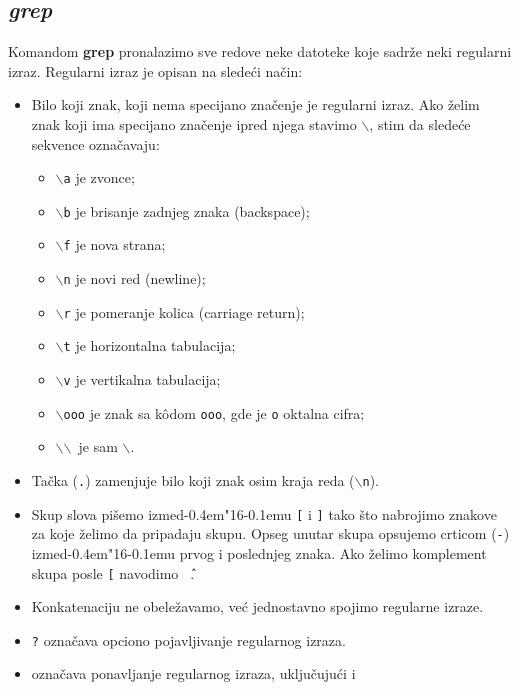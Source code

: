 \documentclass[12pt,a4paper,titlepage]{article}
\def\d{d\kern-0.4em\char"16\kern-0.1em}
\def\bs{$\backslash$}
\begin{document}
    \subsection{\em grep}
      \label{sub:grep}
      Komandom {\bf grep} pronalazimo sve redove neke datoteke koje sadr\v ze
      neki regularni izraz.
      Regularni izraz je opisan na slede\'ci na\v cin:
      \begin{itemize}
      \item
        Bilo koji znak, koji nema specijano zna\v cenje je regularni izraz.
        Ako \v zelim znak koji ima specijano zna\v cenje ipred njega stavimo
        {\tt\bs}, stim da slede\'ce sekvence ozna\v cavaju:
        \begin{itemize}
        \item
          {\tt\bs a} je zvonce;
        \item
          {\tt\bs b} je brisanje zadnjeg znaka (backspace);
        \item
          {\tt\bs f} je nova strana;
        \item
          {\tt\bs n} je novi red (newline);
        \item
          {\tt\bs r} je pomeranje kolica (carriage return);
        \item
          {\tt\bs t} je horizontalna tabulacija;
        \item
          {\tt\bs v} je vertikalna tabulacija;
        \item
          {\tt\bs ooo} je znak sa k\^odom {\tt ooo}, gde je {\tt o} oktalna
          cifra;
        \item
          \bs\bs\ je sam \bs.
        \end{itemize}
      \item
        Ta\v cka ({\tt.}) zamenjuje bilo koji znak osim kraja reda
        ({\tt\bs n}).
      \item
        Skup slova pi\v semo izme\d u {\tt[} i {\tt]} tako \v sto nabrojimo
        znakove za koje \v zelimo da pripadaju skupu.
        Opseg unutar skupa opsujemo crticom ({\tt-}) izme\d u prvog i
        poslednjeg znaka.
        Ako \v zelimo komplement skupa posle {\tt[} navodimo {\tt\^\ }.
      \item
        Konkatenaciju ne obele\v zavamo, ve\'c jednostavno spojimo regularne
        izraze.
      \item
        {\tt?} ozna\v cava opciono pojavljivanje regularnog izraza.
      \item
        {\tt*} ozna\v cava ponavljanje regularnog izraza, uklju\v cuju\'ci i

\end{itemize}
\end{document}
